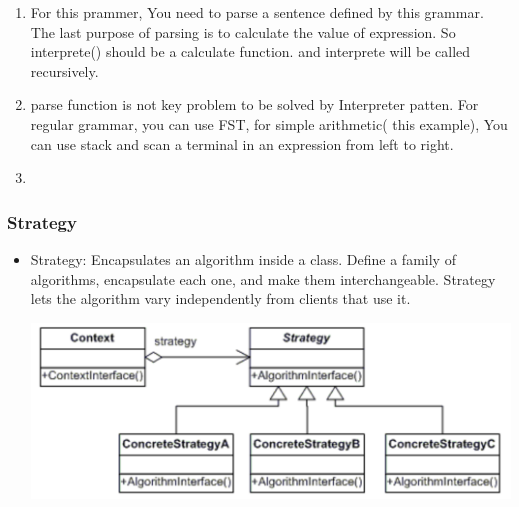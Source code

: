 \documentclass[a4paper,12pt,twoside]{book}
\begin{document}
\begin{itemize}
\begin{enumerate}
\item For this prammer, You need to parse a sentence defined by this grammar. The last purpose of parsing is to calculate the value of expression. So interprete() should be a calculate function. and interprete will be called recursively. 

\item parse function is not key problem to be solved by Interpreter patten. For regular grammar, you can use FST, for simple arithmetic( this example), You can use stack and scan a terminal in an expression from left to right. 
\item 


\end{enumerate}

\end{itemize}


\subsubsection{Strategy}
\begin{itemize}
\item Strategy: Encapsulates an algorithm inside a class. Define a family of algorithms, encapsulate each one, and make them interchangeable.            Strategy lets the algorithm vary independently from clients that use it.

\includegraphics[scale=0.75]{pics/strategy.png}

\end{itemize}
\end{document}
